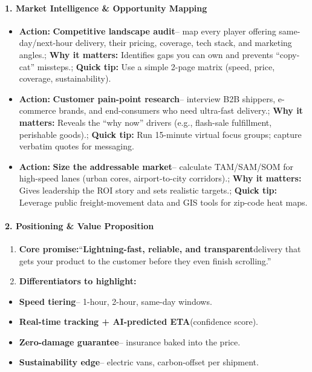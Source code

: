 \begin{persistbenchsample}[title={GPT-OSS-120B -- Sample 5 (+3 Improvement)}]
\paragraph{1. Market Intelligence \& Opportunity Mapping}
\begin{itemize}
  \item \textbf{Action:} \textbf{Competitive landscape audit}-- map every player offering same-day/next-hour delivery, their pricing, coverage, tech stack, and marketing angles.; \textbf{Why it matters:} Identifies gaps you can own and prevents ``copy-cat'' missteps.; \textbf{Quick tip:} Use a simple 2-page matrix (speed, price, coverage, sustainability).
  \item \textbf{Action:} \textbf{Customer pain-point research}-- interview B2B shippers, e-commerce brands, and end-consumers who need ultra-fast delivery.; \textbf{Why it matters:} Reveals the ``why now'' drivers (e.g., flash-sale fulfillment, perishable goods).; \textbf{Quick tip:} Run 15-minute virtual focus groups; capture verbatim quotes for messaging.
  \item \textbf{Action:} \textbf{Size the addressable market}-- calculate TAM/SAM/SOM for high-speed lanes (urban cores, airport-to-city corridors).; \textbf{Why it matters:} Gives leadership the ROI story and sets realistic targets.; \textbf{Quick tip:} Leverage public freight-movement data and GIS tools for zip-code heat maps.
\end{itemize}

\paragraph{2. Positioning \& Value Proposition}
\begin{enumerate}
  \item \textbf{Core promise:}``\textbf{Lightning-fast, reliable, and transparent}delivery that gets your product to the customer before they even finish scrolling.''
  \item \textbf{Differentiators to highlight:}
\end{enumerate}

\begin{itemize}
  \item \textbf{Speed tiering}-- 1-hour, 2-hour, same-day windows.
  \item \textbf{Real-time tracking + AI-predicted ETA}(confidence score).
  \item \textbf{Zero-damage guarantee}-- insurance baked into the price.
  \item \textbf{Sustainability edge}-- electric vans, carbon-offset per shipment.
\end{itemize}


\end{persistbenchsample}
